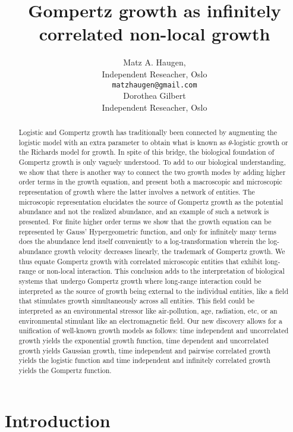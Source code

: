 \documentclass{article}
\title{Gompertz growth as infinitely correlated non-local growth}
\author{Matz A. Haugen, \\
Independent Reseacher, Oslo\\
\texttt{matzhaugen@gmail.com} \\
  \And
  Dorothea Gilbert \\
  Independent Reseacher, Oslo\\
}
\begin{document}
\maketitle

\begin{abstract}
Logistic and Gompertz growth has traditionally been connected by augmenting the logistic model with an extra parameter to obtain what is known as $\theta$-logistic growth or the Richards model for growth. In spite of this bridge, the biological foundation of Gompertz growth is only vaguely understood. 
To add to our biological understanding, we show that there is another way to connect the two growth modes by adding higher order terms in the growth equation, and present both a macroscopic and microscopic representation of growth where the latter involves a network of entities. 
The microscopic representation elucidates the source of Gompertz growth as the potential abundance and not the realized abundance, and an example of such a network is presented. 
For finite higher order terms we show that the growth equation can be represented by Gauss' Hypergeometric function, and only for infinitely many terms does the abundance lend itself conveniently to a log-transformation wherein the log-abundance growth velocity decreases linearly, the trademark of Gompertz growth. We thus equate Gompertz growth with correlated microscopic entities that exhibit long-range or non-local interaction. 
This conclusion adds to the interpretation of biological systems that undergo Gompertz growth where long-range interaction could be interpreted as the source of growth being external to the individual entities, like a field that stimulates growth simultaneously across all entities. 
This field could be interpreted as an environmental stressor like air-pollution, age, radiation, etc, or an environmental stimulant like an electromagnetic field. 
Our new discovery allows for a unification of well-known growth models as follows: time independent and uncorrelated growth yields the exponential growth function, time dependent and uncorrelated growth yields Gaussian growth, time independent and pairwise correlated growth yields the logistic function and time independent and infinitely correlated growth yields the Gompertz function. 

\end{abstract}


\section{Introduction}
\end{document}

